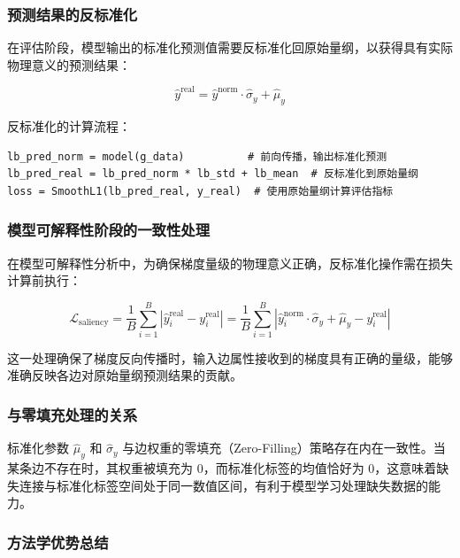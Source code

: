 \subsubsection{预测结果的反标准化}

在评估阶段，模型输出的标准化预测值需要反标准化回原始量纲，以获得具有实际物理意义的预测结果：

\begin{equation}
\hat{y}^{\text{real}} = \hat{y}^{\text{norm}} \cdot \hat{\sigma}_y + \hat{\mu}_y
\end{equation}

反标准化的计算流程：

\begin{verbatim}
lb_pred_norm = model(g_data)          # 前向传播，输出标准化预测
lb_pred_real = lb_pred_norm * lb_std + lb_mean  # 反标准化到原始量纲
loss = SmoothL1(lb_pred_real, y_real)  # 使用原始量纲计算评估指标
\end{verbatim}

\subsubsection{模型可解释性阶段的一致性处理}

在模型可解释性分析中，为确保梯度量级的物理意义正确，反标准化操作需在损失计算前执行：

\begin{equation}
\mathcal{L}_{\text{saliency}} = \frac{1}{B} \sum_{i=1}^{B} \left| \hat{y}_i^{\text{real}} - y_i^{\text{real}} \right| = \frac{1}{B} \sum_{i=1}^{B} \left| \hat{y}_i^{\text{norm}} \cdot \hat{\sigma}_y + \hat{\mu}_y - y_i^{\text{real}} \right|
\end{equation}

这一处理确保了梯度反向传播时，输入边属性接收到的梯度具有正确的量级，能够准确反映各边对原始量纲预测结果的贡献。

\subsubsection{与零填充处理的关系}

标准化参数 $\hat{\mu}_y$ 和 $\hat{\sigma}_y$ 与边权重的零填充（Zero-Filling）策略存在内在一致性。当某条边不存在时，其权重被填充为 0，而标准化标签的均值恰好为 0，这意味着缺失连接与标准化标签空间处于同一数值区间，有利于模型学习处理缺失数据的能力。

\subsubsection{方法学优势总结}

